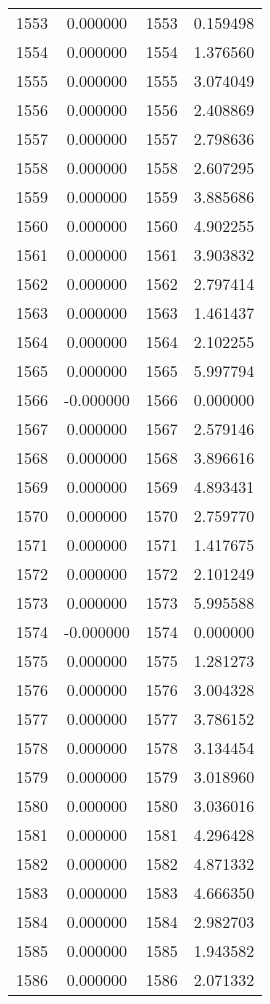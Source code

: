 \documentclass[12pt]{article}
\begin{document}
\begin{longtable}{@{}cccc@{}}
1553 & 0.000000 & 1553 & 0.159498 \\
1554 & 0.000000 & 1554 & 1.376560 \\
1555 & 0.000000 & 1555 & 3.074049 \\
1556 & 0.000000 & 1556 & 2.408869 \\
1557 & 0.000000 & 1557 & 2.798636 \\
1558 & 0.000000 & 1558 & 2.607295 \\
1559 & 0.000000 & 1559 & 3.885686 \\
1560 & 0.000000 & 1560 & 4.902255 \\
1561 & 0.000000 & 1561 & 3.903832 \\
1562 & 0.000000 & 1562 & 2.797414 \\
1563 & 0.000000 & 1563 & 1.461437 \\
1564 & 0.000000 & 1564 & 2.102255 \\
1565 & 0.000000 & 1565 & 5.997794 \\
1566 & -0.000000 & 1566 & 0.000000 \\
1567 & 0.000000 & 1567 & 2.579146 \\
1568 & 0.000000 & 1568 & 3.896616 \\
1569 & 0.000000 & 1569 & 4.893431 \\
1570 & 0.000000 & 1570 & 2.759770 \\
1571 & 0.000000 & 1571 & 1.417675 \\
1572 & 0.000000 & 1572 & 2.101249 \\
1573 & 0.000000 & 1573 & 5.995588 \\
1574 & -0.000000 & 1574 & 0.000000 \\
1575 & 0.000000 & 1575 & 1.281273 \\
1576 & 0.000000 & 1576 & 3.004328 \\
1577 & 0.000000 & 1577 & 3.786152 \\
1578 & 0.000000 & 1578 & 3.134454 \\
1579 & 0.000000 & 1579 & 3.018960 \\
1580 & 0.000000 & 1580 & 3.036016 \\
1581 & 0.000000 & 1581 & 4.296428 \\
1582 & 0.000000 & 1582 & 4.871332 \\
1583 & 0.000000 & 1583 & 4.666350 \\
1584 & 0.000000 & 1584 & 2.982703 \\
1585 & 0.000000 & 1585 & 1.943582 \\
1586 & 0.000000 & 1586 & 2.071332 \\

\end{longtable}
\end{document}

